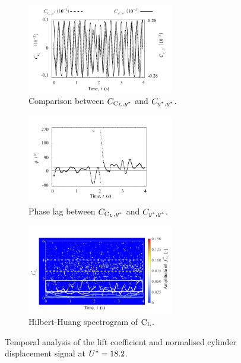 \documentclass[oneside]{utmthesis}
\begin{document}
\begin{figure}[H]
  \centering
  \begin{subfigure}[h]{1\textwidth}
    \hspace{2.4cm}
    \includegraphics[width=0.7\textwidth]{figs/tempAnalysisStableInitialBranch-a}
    \caption{Comparison between $C_{\text{C}_{L},y^{*}}$ and $C_{y^{*},y^{*}}$.}
    \label{fig:tempAnalysisStableInitialBranch-a}
  \end{subfigure}

  \begin{subfigure}[h]{1\textwidth}
    \hspace{2.4cm}
    \includegraphics[width=0.7\textwidth]{figs/tempAnalysisStableInitialBranch-b}
    \caption{Phase lag between $C_{\text{C}_{L},y^{*}}$ and $C_{y^{*},y^{*}}$.}
    \label{fig:tempAnalysisStableInitialBranch-b}
  \end{subfigure}

  \begin{subfigure}[h]{1\textwidth}
    \hspace{2.4cm}
    \includegraphics[width=0.7\textwidth]{figs/tempAnalysisStableInitialBranch-c}
    \caption{Hilbert-Huang spectrogram of $\text{C}_{\text{L}}$.}
    \label{fig:tempAnalysisStableInitialBranch-c}
  \end{subfigure}
  \caption{Temporal analysis of the lift coefficient and normalised cylinder displacement signal at $U^{*} = 18.2$.}
  \label{fig:tempAnalysisStableInitialBranch}
\end{figure}
\end{document}
